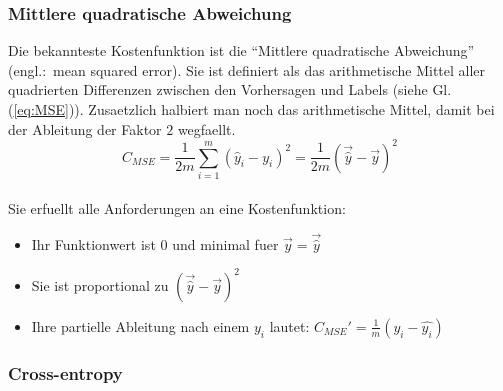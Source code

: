 \subsubsection{Mittlere quadratische Abweichung}
Die bekannteste Kostenfunktion ist die ``Mittlere quadratische Abweichung''
(engl.:\ mean squared error). Sie ist definiert als das arithmetische Mittel
aller quadrierten Differenzen zwischen den Vorhersagen und Labels (siehe Gl.
(\ref{eq:MSE})).
Zusaetzlich halbiert man noch das arithmetische Mittel, damit bei der Ableitung der Faktor
$2$ wegfaellt.
\\
\begin{equation}\label{eq:MSE}
  C_{MSE} = \frac{1}{2m}\sum_{i=1}^{m}{(\hat{y}_i - y_i)}^2 = \frac{1}{2m}{(\vec{\hat{y}} - \vec{y})}^2
\end{equation}
\\
Sie erfuellt alle Anforderungen an eine Kostenfunktion:
\begin{itemize}
\item{Ihr Funktionwert ist 0 und minimal fuer $\vec{y} = \vec{\hat{y}}$}
\item{Sie ist proportional zu ${(\vec{\hat{y}}-\vec{y})}^2$}
\item{Ihre partielle Ableitung nach einem $y_i$ lautet: $C_{MSE}'=\frac{1}{m}(y_i-\hat{y_i})$}
\end{itemize}


\subsubsection{Cross-entropy}


